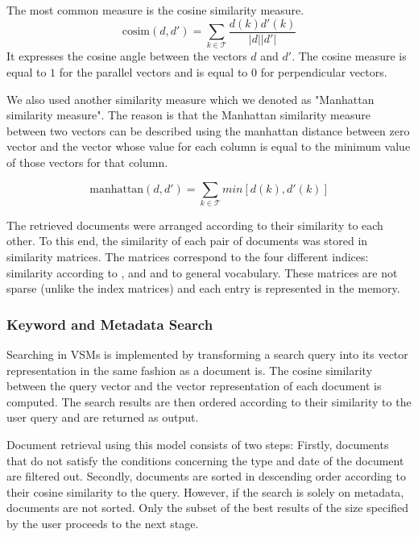 The most common measure is the cosine similarity measure.
\[\text{cosim}(d,d') = \sum_{k \in \mathcal{T}}\frac{d(k)d'(k)}{|d||d'|}\]
It expresses the cosine angle between the vectors $d$ and $d'$. The cosine measure is equal to $1$ for the parallel vectors and is equal to $0$ for perpendicular vectors.

We also used another similarity measure which we denoted as "Manhattan similarity measure". The reason is that the Manhattan similarity measure between two vectors can be described using the manhattan distance between zero vector and the vector whose value for each column is equal to the minimum value of those vectors for that column.

\[\text{manhattan}(d,d') = \sum_{k \in \mathcal{T}}min[d(k), d'(k)]\]



The retrieved documents were arranged according to their similarity to each other. To this end, the similarity of each pair of documents was stored in similarity matrices. The matrices correspond to the four different indices: similarity according to ,  and  and to general vocabulary. These matrices are not sparse (unlike the index matrices) and each entry is represented in the memory.   

\subsubsection{Keyword and Metadata Search}\label{sec:keyword_search}

Searching in VSMs is implemented by transforming a search query into its vector representation in the same fashion as a document is. The cosine similarity between the query vector and the vector representation of each document is computed. The search results are then ordered according to their similarity to the user query and are returned as output. 

Document retrieval using this model consists of two steps: Firstly, documents that do not satisfy the conditions concerning the type and date of the document are filtered out. Secondly, documents are sorted in descending order according to their cosine similarity to the query. However, if the search is solely on metadata, documents are not sorted. Only the subset of the best results of the size specified by the user proceeds to the next stage.

